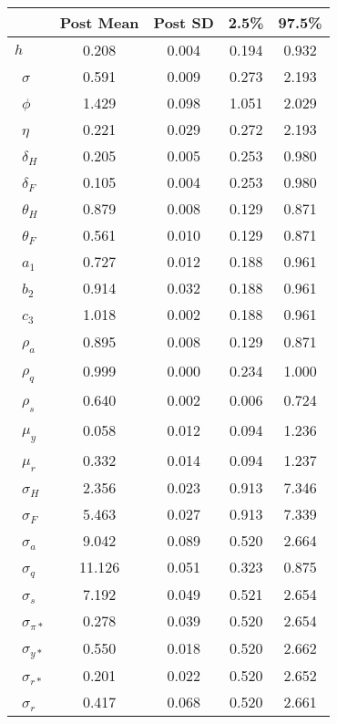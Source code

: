 \begin{tiny}\begin{tabular}{lcccc}
\hline
&\textbf{Post Mean}&\textbf{Post SD}&\textbf{2.5\%}&\textbf{97.5\%}\\\hline
\textbf{$ h             $}&0.208&0.004&0.194&0.932\\\
\textbf{$ \sigma        $}&0.591&0.009&0.273&2.193\\\
\textbf{$ \phi          $}&1.429&0.098&1.051&2.029\\\
\textbf{$ \eta          $}&0.221&0.029&0.272&2.193\\\
\textbf{$ \delta_{H}    $}&0.205&0.005&0.253&0.980\\\
\textbf{$ \delta_{F}    $}&0.105&0.004&0.253&0.980\\\
\textbf{$ \theta_{H}    $}&0.879&0.008&0.129&0.871\\\
\textbf{$ \theta_{F}    $}&0.561&0.010&0.129&0.871\\\
\textbf{$ a_{1}         $}&0.727&0.012&0.188&0.961\\\
\textbf{$ b_{2}         $}&0.914&0.032&0.188&0.961\\\
\textbf{$ c_{3}         $}&1.018&0.002&0.188&0.961\\\
\textbf{$ \rho_{a}      $}&0.895&0.008&0.129&0.871\\\
\textbf{$ \rho_{q}      $}&0.999&0.000&0.234&1.000\\\
\textbf{$ \rho_{s}      $}&0.640&0.002&0.006&0.724\\\
\textbf{$ \mu_{y}       $}&0.058&0.012&0.094&1.236\\\
\textbf{$ \mu_{r}       $}&0.332&0.014&0.094&1.237\\\
\textbf{$ \sigma_{H}    $}&2.356&0.023&0.913&7.346\\\
\textbf{$ \sigma_{F}    $}&5.463&0.027&0.913&7.339\\\
\textbf{$ \sigma_{a}    $}&9.042&0.089&0.520&2.664\\\
\textbf{$ \sigma_{q}    $}&11.126&0.051&0.323&0.875\\\
\textbf{$ \sigma_{s}    $}&7.192&0.049&0.521&2.654\\\
\textbf{$ \sigma_{\pi*} $}&0.278&0.039&0.520&2.654\\\
\textbf{$ \sigma_{y*}   $}&0.550&0.018&0.520&2.662\\\
\textbf{$ \sigma_{r*}   $}&0.201&0.022&0.520&2.652\\\
\textbf{$ \sigma_{r}    $}&0.417&0.068&0.520&2.661\\\hline
\end{tabular}
\end{tiny}
